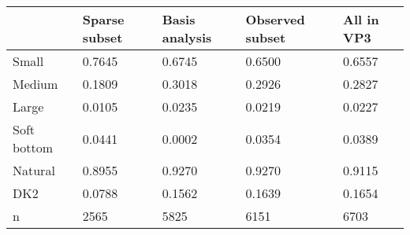 \begin{tabular}{lllll}
\toprule
 & Sparse subset & Basis analysis & Observed subset & All in VP3 \\
\midrule
Small & 0.7645 & 0.6745 & 0.6500 & 0.6557 \\
Medium & 0.1809 & 0.3018 & 0.2926 & 0.2827 \\
Large & 0.0105 & 0.0235 & 0.0219 & 0.0227 \\
Soft bottom & 0.0441 & 0.0002 & 0.0354 & 0.0389 \\
Natural & 0.8955 & 0.9270 & 0.9270 & 0.9115 \\
DK2 & 0.0788 & 0.1562 & 0.1639 & 0.1654 \\
n & 2565 & 5825 & 6151 & 6703 \\
\bottomrule
\end{tabular}
